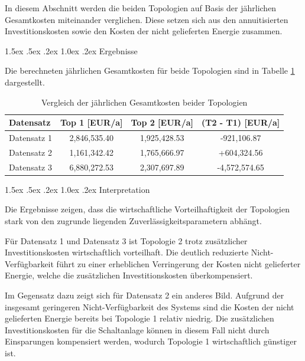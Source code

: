 \documentclass[a4paper,12pt]{article}
\makeatletter
\renewcommand\paragraph{\@startsection{paragraph}{4}{\z@}%
	{1.5ex \@plus .5ex \@minus .2ex}%
	{1.0ex \@plus .2ex}%
	{\normalfont\normalsize\bfseries}}%
\makeatother
\begin{document}
In diesem Abschnitt werden die beiden Topologien auf Basis der jährlichen
Gesamtkosten miteinander verglichen. Diese setzen sich aus den
annuitisierten Investitionskosten sowie den Kosten der nicht gelieferten
Energie zusammen.

\paragraph{Ergebnisse}

Die berechneten jährlichen Gesamtkosten für beide Topologien sind in
Tabelle \ref{tab:economic_comparison} dargestellt.

\begin{table}[h]
\centering
\begin{tabular}{lccc}
\hline
Datensatz & Top 1 [EUR/a] & Top 2 [EUR/a] & (T2 - T1) [EUR/a] \\
\hline
Datensatz 1 & 2{,}846{,}535.40 & 1{,}925{,}428.53 & -921{,}106.87 \\
Datensatz 2 & 1{,}161{,}342.42 & 1{,}765{,}666.97 & +604{,}324.56 \\
Datensatz 3 & 6{,}880{,}272.53 & 2{,}307{,}697.89 & -4{,}572{,}574.65 \\
\hline
\end{tabular}
\caption{Vergleich der jährlichen Gesamtkosten beider Topologien}
\label{tab:economic_comparison}
\end{table}

\paragraph{Interpretation}

Die Ergebnisse zeigen, dass die wirtschaftliche Vorteilhaftigkeit der
Topologien stark von den zugrunde liegenden Zuverlässigkeitsparametern
abhängt.

Für Datensatz 1 und Datensatz 3 ist Topologie 2 trotz zusätzlicher
Investitionskosten wirtschaftlich vorteilhaft. Die deutlich reduzierte
Nicht-Verfügbarkeit führt zu einer erheblichen Verringerung der Kosten
nicht gelieferter Energie, welche die zusätzlichen Investitionskosten
überkompensiert.

Im Gegensatz dazu zeigt sich für Datensatz 2 ein anderes Bild. Aufgrund
der insgesamt geringeren Nicht-Verfügbarkeit des Systems sind die Kosten
der nicht gelieferten Energie bereits bei Topologie 1 relativ niedrig.
Die zusätzlichen Investitionskosten für die Schaltanlage können in diesem
Fall nicht durch Einsparungen kompensiert werden, wodurch Topologie 1
wirtschaftlich günstiger ist.
\end{document}
